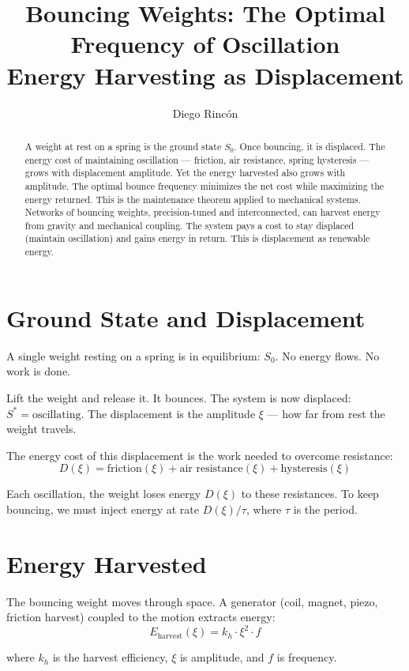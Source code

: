 \documentclass[12pt]{article}
\title{Bouncing Weights: The Optimal Frequency of Oscillation\\
Energy Harvesting as Displacement}
\author{Diego Rincón}
\date{}
\begin{document}
\maketitle

\begin{abstract}
A weight at rest on a spring is the ground state $S_0$. Once bouncing, it is displaced. The energy cost of maintaining oscillation — friction, air resistance, spring hysteresis — grows with displacement amplitude. Yet the energy harvested also grows with amplitude. The optimal bounce frequency minimizes the net cost while maximizing the energy returned. This is the maintenance theorem applied to mechanical systems. Networks of bouncing weights, precision-tuned and interconnected, can harvest energy from gravity and mechanical coupling. The system pays a cost to stay displaced (maintain oscillation) and gains energy in return. This is displacement as renewable energy.
\end{abstract}

\section{Ground State and Displacement}

A single weight resting on a spring is in equilibrium: $S_0$. No energy flows. No work is done.

Lift the weight and release it. It bounces. The system is now displaced: $S^* = \text{oscillating}$. The displacement is the amplitude $\xi$ — how far from rest the weight travels.

The energy cost of this displacement is the work needed to overcome resistance:
\[
D(\xi) = \text{friction}(\xi) + \text{air resistance}(\xi) + \text{hysteresis}(\xi)
\]

Each oscillation, the weight loses energy $D(\xi)$ to these resistances. To keep bouncing, we must inject energy at rate $D(\xi) / \tau$, where $\tau$ is the period.

\section{Energy Harvested}

The bouncing weight moves through space. A generator (coil, magnet, piezo, friction harvest) coupled to the motion extracts energy:
\[
E_{\text{harvest}}(\xi) = k_h \cdot \xi^2 \cdot f
\]

where $k_h$ is the harvest efficiency, $\xi$ is amplitude, and $f$ is frequency.
\end{document}
